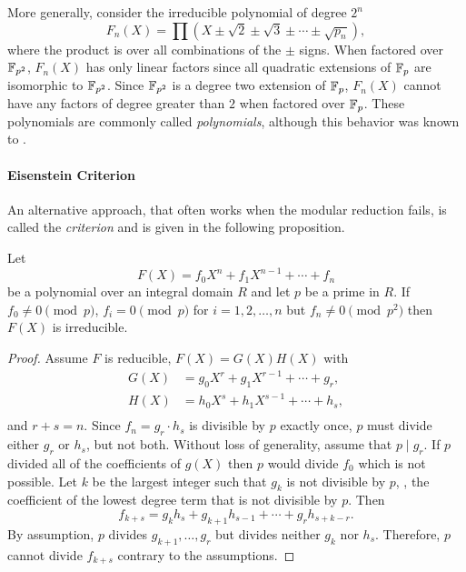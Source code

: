 More generally, consider the irreducible polynomial of degree
$2^n$
\[
F_n(X) = \prod \left(X \pm \sqrt{2} \pm \sqrt{3} \pm \cdots \pm
\sqrt{p_n}\right),
\] 
where the product is over all combinations of the $\pm$ signs.
When factored over $\mathbb{F}_{p^2}$, $F_n(X)$ has only linear factors since
all quadratic extensions of $\mathbb{F}_p$ are isomorphic to $\mathbb{F}_{p^2}$.
Since $\mathbb{F}_{p^2}$ is a degree two extension of $\mathbb{F}_p$, $F_n(X)$ cannot
have any factors of degree greater than $2$ when factored over $\mathbb{F}_p$.
These polynomials are commonly called {\em {\SwinnertonDyer}
polynomials}, although this behavior
was known to {\Hilbert}.

\paragraph{Eisenstein Criterion}

An alternative approach, that often works when the modular reduction
fails, is called the {\em {\Eisenstein} criterion} and is given in the following proposition.

\begin{proposition}[Eisenstein] \label{Eisenstein:Prop}
Let
\[
F(X) = f_0 X^n + f_1 X^{n-1} + \cdots + f_n
\]
be a polynomial over an integral domain $R$ and let $p$ be a prime in
$R$.  If $f_0 \not= 0 \pmod{p}$, $f_i = 0 \pmod{p}$ for $i = 1, 2,
\ldots, n$ but $f_n \not= 0 \pmod{p^2}$ then $F(X)$ is irreducible.
\end{proposition}

\begin{proof}
Assume $F$ is reducible, $F(X) = G(X) H(X)$ with
\[
\begin{aligned}
G(X) & = g_0 X^r + g_1 X^{r-1} + \cdots + g_r, \\
H(X) & = h_0 X^s + h_1 X^{s-1} + \cdots + h_s, \\
\end{aligned}
\]
and $r+s = n$.  Since $f_n = g_r \cdot h_s$ is divisible by $p$
exactly once, $p$ must divide either $g_r$ or $h_s$, but not both.
Without loss of generality, assume that $p\mid g_r$.  If $p$ divided
all of the coefficients of $g(X)$ then $p$ would divide $f_0$ which is
not possible.  Let $k$ be the largest integer such that $g_k$ is not
divisible by $p$, \ie, the coefficient of the lowest degree term that
is not divisible by $p$.  Then
\[
f_{k+s} = g_k h_s + g_{k+1}h_{s-1} + \cdots + g_r h_{s+k-r}.
\]
By assumption, $p$ divides $g_{k+1}, \ldots, g_r$ but
divides neither $g_k$ nor $h_s$.  Therefore, $p$ cannot divide
$f_{k+s}$ contrary to the assumptions.
\end{proof}


